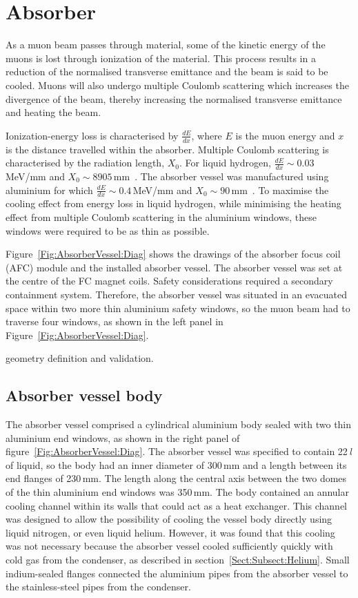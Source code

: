 \graphicspath{{11-Absorber/Figures/}}

\section{Absorber}
\label{Sect:Absorber}
As a muon beam passes through material, some of the kinetic energy
of the muons is lost through ionization of the material.
This process results in a reduction of the normalised
transverse emittance and the beam is said to be cooled.
Muons will also undergo multiple Coulomb scattering which
increases the divergence of the beam, thereby
increasing the normalised transverse emittance and heating the beam.

Ionization-energy loss is characterised by $\frac{dE}{dx}$, where $E$
is the muon energy and $x$ is the distance travelled within the
absorber.
Multiple Coulomb scattering is characterised by the radiation length,
$X_0$.
For liquid hydrogen, $\frac{dE}{dx} \sim 0.03$\,MeV/mm and $X_0 \sim
8905$\,mm~\cite{PhysRevD.98.030001}.
The absorber vessel was manufactured using aluminium for which
$\frac{dE}{dx} \sim 0.4$\,MeV/mm and $X_0\sim
90$\,mm~\cite{PhysRevD.98.030001}.
To maximise the cooling effect from energy loss in liquid hydrogen,
while minimising the heating effect from multiple Coulomb scattering
in the aluminium windows, these windows were required to be as thin as possible.

Figure~\ref{Fig:AbsorberVessel:Diag} shows the drawings of the absorber focus coil (AFC) module and the installed absorber vessel. The absorber vessel was set at the centre of the FC magnet coils.  Safety considerations required a secondary containment system. Therefore, the absorber vessel was situated in an evacuated space within two more thin aluminium safety windows, so the muon beam had to traverse four windows, as shown in the left panel in Figure~\ref{Fig:AbsorberVessel:Diag}.

geometry definition and validation.

\subsection{Absorber vessel body}
\label{SubSect:AbsorberVessel:Body}

The absorber vessel comprised a cylindrical aluminium body sealed with
two thin aluminium end windows, as shown in the right panel of
figure~\ref{Fig:AbsorberVessel:Diag}.
The absorber vessel was specified to contain 22\,\textit{l} of liquid, so
the body had an inner diameter of 300\,mm and a length between its end
flanges of 230\,mm.  
The length along the central axis between the two domes of the thin aluminium end
windows was 350\,mm.
The body contained an annular cooling channel within its walls
that could act as a heat exchanger. 
This channel was designed to allow the possibility of cooling the
vessel body directly using liquid nitrogen, or even liquid helium. 
However, it was found that this cooling was not necessary because the absorber vessel
cooled sufficiently quickly with cold gas from the condenser,
as described in section~\ref{Sect:Subsect:Helium}. 
Small indium-sealed flanges connected the aluminium pipes from
the absorber vessel to the stainless-steel pipes from the condenser. 


